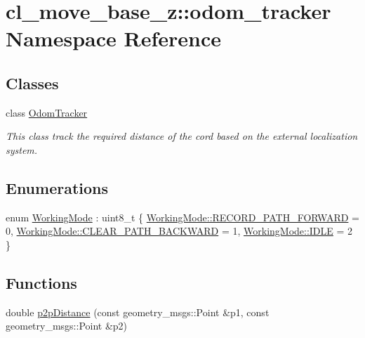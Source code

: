\hypertarget{namespacecl__move__base__z_1_1odom__tracker}{}\section{cl\+\_\+move\+\_\+base\+\_\+z\+:\+:odom\+\_\+tracker Namespace Reference}
\label{namespacecl__move__base__z_1_1odom__tracker}
\subsection*{Classes}
\begin{DoxyCompactItemize}
\item 
class \hyperlink{classcl__move__base__z_1_1odom__tracker_1_1OdomTracker}{Odom\+Tracker}
\begin{DoxyCompactList}\small\item\em This class track the required distance of the cord based on the external localization system. \end{DoxyCompactList}\end{DoxyCompactItemize}
\subsection*{Enumerations}
\begin{DoxyCompactItemize}
\item 
enum \hyperlink{namespacecl__move__base__z_1_1odom__tracker_ac46b05813b2791604f6cd0a39ace3ef8}{Working\+Mode} \+: uint8\+\_\+t \{ \hyperlink{namespacecl__move__base__z_1_1odom__tracker_ac46b05813b2791604f6cd0a39ace3ef8a989d06a586bcf9520889228da7faa643}{Working\+Mode\+::\+R\+E\+C\+O\+R\+D\+\_\+\+P\+A\+T\+H\+\_\+\+F\+O\+R\+W\+A\+RD} = 0, 
\hyperlink{namespacecl__move__base__z_1_1odom__tracker_ac46b05813b2791604f6cd0a39ace3ef8a0cf8f27617189e35619df3c18bda6274}{Working\+Mode\+::\+C\+L\+E\+A\+R\+\_\+\+P\+A\+T\+H\+\_\+\+B\+A\+C\+K\+W\+A\+RD} = 1, 
\hyperlink{namespacecl__move__base__z_1_1odom__tracker_ac46b05813b2791604f6cd0a39ace3ef8aa5daf7f2ebbba4975d61dab1c40188c7}{Working\+Mode\+::\+I\+D\+LE} = 2
 \}
\end{DoxyCompactItemize}
\subsection*{Functions}
\begin{DoxyCompactItemize}
\item 
double \hyperlink{namespacecl__move__base__z_1_1odom__tracker_a501582a760a02ce0069d95bfc67ca973}{p2p\+Distance} (const geometry\+\_\+msgs\+::\+Point \&p1, const geometry\+\_\+msgs\+::\+Point \&p2)
\end{DoxyCompactItemize}


